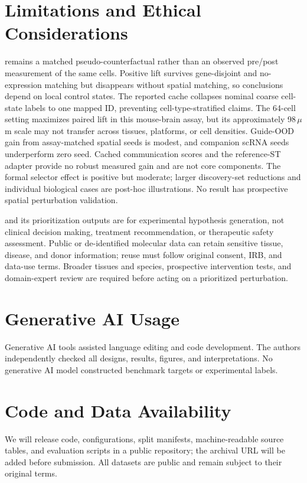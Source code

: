 \section{Limitations and Ethical Considerations}
\label{sec:limitations_ethical_considerations}
\ppp remains a matched pseudo-counterfactual rather than an observed pre/post
measurement of the same cells. Positive lift survives gene-disjoint and
no-expression matching but disappears without spatial matching, so conclusions
depend on local control states. The reported cache collapses nominal coarse
cell-state labels to one mapped ID, preventing cell-type-stratified claims.
The 64-cell setting maximizes paired lift in this mouse-brain assay, but its
approximately 98\,$\mu$m scale may not transfer across tissues, platforms, or
cell densities. Guide-OOD gain from assay-matched spatial seeds is modest, and
companion scRNA seeds underperform zero seed. Cached communication scores and
the reference-ST adapter provide no robust measured gain and are not core
components. The formal selector effect is positive but moderate; larger
discovery-set reductions and individual biological cases are post-hoc
illustrations. No result has prospective spatial perturbation validation.

\methodname{} and its prioritization outputs are for experimental hypothesis
generation, not clinical decision making, treatment recommendation, or
therapeutic safety assessment. Public or de-identified molecular data can
retain sensitive tissue, disease, and donor information; reuse must follow
original consent, IRB, and data-use terms. Broader tissues and species,
prospective intervention tests, and domain-expert review are required before
acting on a prioritized perturbation.

\clearpage
\section{Generative AI Usage}
Generative AI tools assisted language editing and code development. The authors
independently checked all designs, results, figures, and interpretations. No
generative AI model constructed benchmark targets or experimental labels.

\section{Code and Data Availability}
\label{sec:code_release}
We will release code, configurations, split manifests, machine-readable source
tables, and evaluation scripts in a public repository; the archival URL will be
added before submission. All datasets are public and remain subject to their
original terms.

